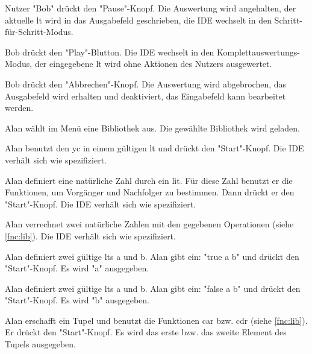 \documentclass[parskip=full,11pt,twoside]{scrartcl}
\begin{document}

{Nutzer "Bob" drückt den "Pause"-Knopf.}
{Die Auswertung wird angehalten, der aktuelle \gls{lt} wird in das Ausgabefeld geschrieben, die IDE wechselt in den Schritt-für-Schritt-Modus.}

{Bob drückt den "Play"-Blutton.}
{Die IDE wechselt in den Komplettauswertungs-Modus, der eingegebene \gls{lt} wird ohne Aktionen des Nutzers ausgewertet.}

{Bob drückt den "Abbrechen"-Knopf.}
{Die Auswertung wird abgebrochen, das Ausgabefeld wird erhalten und deaktiviert, das Eingabefeld kann bearbeitet werden.}
 

{Alan wählt im Menü eine Bibliothek aus.}
{Die gewählte Bibliothek wird geladen.}

{Alan benutzt den \gls{yc} in einem gültigen \gls{lt} und drückt den "Start"-Knopf.}
{Die IDE verhält sich wie spezifiziert.}

{Alan definiert eine natürliche Zahl durch ein \gls{lit}.
 Für diese Zahl benutzt er die Funktionen, um Vorgänger und Nachfolger zu bestimmen.
 Dann drückt er den "Start"-Knopf.}
{Die IDE verhält sich wie spezifiziert.}

{Alan verrechnet zwei natürliche Zahlen mit den gegebenen Operationen (siehe \ref{fnc:lib}).}
{Die IDE verhält sich wie spezifiziert.}

{Alan definiert zwei gültige \glspl{lt} a und b.
 Alan gibt ein: "true a b" und drückt den "Start"-Knopf.}
{Es wird "a" ausgegeben.}

{Alan definiert zwei gültige \glspl{lt} a und b.
 Alan gibt ein: "false a b" und drückt den "Start"-Knopf.}
{Es wird "b" ausgegeben.}

{Alan erschafft ein Tupel und benutzt die Funktionen car bzw. cdr (siehe \ref{fnc:lib}).
 Er drückt den "Start"-Knopf.}
{Es wird das erste bzw. das zweite Element des Tupels ausgegeben.}
\end{document}
